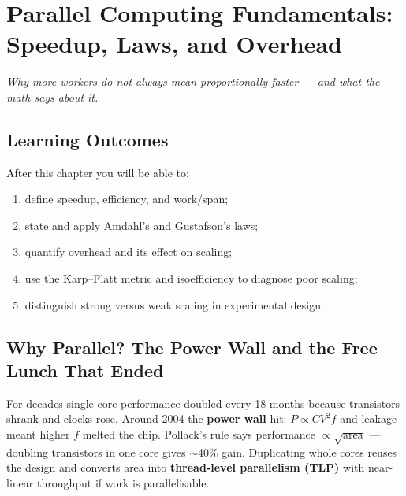 \chapter{Parallel Computing Fundamentals: Speedup, Laws, and Overhead}\label{ch:intro}
\begin{center}\small\textit{Why more workers do not always mean proportionally faster --- and what the math says about it.}\end{center}

\noindent{}
\vspace{0.4em}

\section*{Learning Outcomes}
After this chapter you will be able to:
\begin{enumerate}[label=(L\arabic*)]
  \item define speedup, efficiency, and work/span;
  \item state and apply Amdahl's and Gustafson's laws;
  \item quantify overhead and its effect on scaling;
  \item use the Karp--Flatt metric and isoefficiency to diagnose poor scaling;
  \item distinguish strong versus weak scaling in experimental design.
\end{enumerate}

\section{Why Parallel? The Power Wall and the Free Lunch That Ended}
For decades single-core performance doubled every 18 months because transistors shrank and clocks rose. Around 2004 the \textbf{power wall} hit: $P\propto CV^{2}f$ and leakage meant higher $f$ melted the chip. Pollack's rule says performance $\propto\sqrt{\text{area}}$ --- doubling transistors in one core gives $\sim$40\% gain. Duplicating whole cores reuses the design and converts area into \textbf{thread-level parallelism (TLP)} with near-linear throughput if work is parallelisable.


